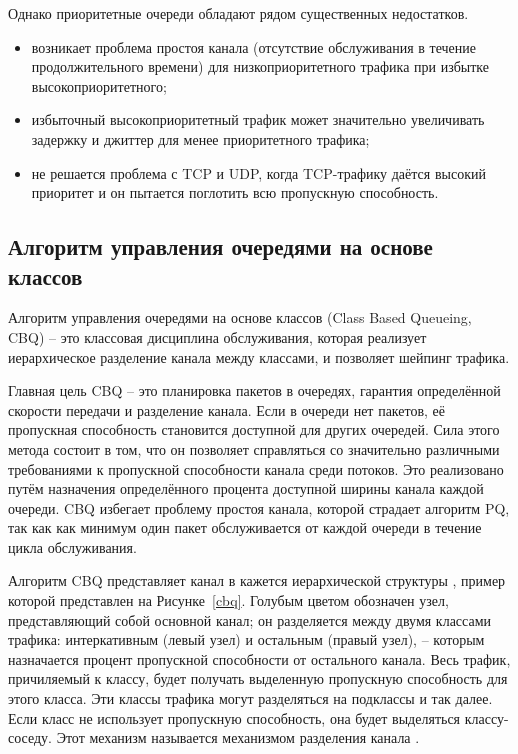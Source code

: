     Однако приоритетные очереди обладают рядом существенных недостатков.
    \begin{itemize}
        \item возникает проблема простоя канала (отсутствие обслуживания в течение продолжительного времени)
			  для низкоприоритетного трафика при избытке высокоприоритетного\cite{packethandling};
        \item избыточный высокоприоритетный трафик может значительно увеличивать
                задержку и джиттер для менее приоритетного трафика;
        \item не решается проблема с TCP и UDP, когда TCP-трафику даётся высокий приоритет и он
                пытается поглотить всю пропускную способность. \cite{suppdiff}
    \end{itemize}

    \subsection{Алгоритм управления очередями на основе классов}

        Алгоритм управления очередями на основе классов (Class Based Queueing, CBQ) -- это
        классовая дисциплина обслуживания, которая реализует
        иерархическое разделение канала между классами, и позволяет
        шейпинг трафика. \cite{tccbq}

        Главная цель CBQ -- это планировка пакетов в очередях, гарантия определённой
        скорости передачи и разделение канала. Если в очереди нет пакетов, её
        пропускная способность становится доступной для других очередей. Сила
        этого метода состоит в том, что он позволяет справляться со значительно
        различными требованиями к пропускной способности канала среди потоков. Это
        реализовано путём назначения определённого процента доступной ширины
        канала каждой очереди. CBQ избегает проблему простоя канала, которой страдает
        алгоритм PQ, так как как минимум один пакет обслуживается от каждой очереди
        в течение цикла обслуживания.\cite{packethandling}

		Алгоритм CBQ представляет канал в кажется иерархической структуры \cite{linksharing},
		пример которой представлен на Рисунке~\ref{cbq}. Голубым цветом обозначен узел,
		представляющий собой основной канал; он разделяется между двумя классами трафика:
		интеркативным (левый узел) и остальным (правый узел), -- которым назначается процент
		пропускной способности от остального канала. Весь трафик, причиляемый к классу,
		будет получать выделенную пропускную способность для этого класса. Эти
		классы трафика могут разделяться на подклассы и так далее. Если класс не использует
		пропускную способность, она будет выделяться классу-соседу. Этот механизм
		называется механизмом разделения канала \cite{linksharing}. 

